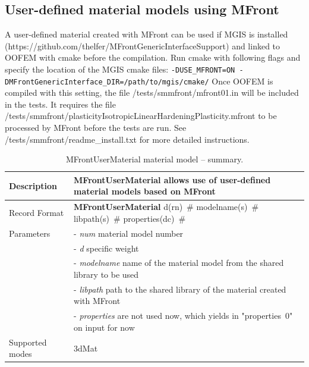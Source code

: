 \documentclass[a4paper]{article}
\newcommand{\descitem}[1]{{\noindent \bf #1}}
\newcommand{\elemparam}[2]{{{#1\tiny (#2)}~\#}}
\newcommand{\param}[1]{{\it #1}}
\newenvironment{mmt}{\begin{tabular}{|l|p{9cm}|}}{\end{tabular}\\}
\newenvironment{mmt}{\begin{tabular}{|l|l|}}{\end{tabular}\\}
\begin{document}
\subsection{User-defined material models using MFront}
A user-defined material created with MFront can be used if MGIS is installed
\newline
(https://github.com/thelfer/MFrontGenericInterfaceSupport) and linked to OOFEM with cmake before the compilation.
Run cmake with following flags and specify the location of the MGIS cmake files:
\newline
\verb|-DUSE_MFRONT=ON -DMFrontGenericInterface_DIR=/path/to/mgis/cmake/|
\newline
Once OOFEM is compiled with this setting, the file /tests/smmfront/mfront01.in will be included in the tests.
It requires the file
\newline
/tests/smmfront/plasticityIsotropicLinearHardeningPlasticity.mfront to be processed by MFront before the tests are run.
\newline
See /tests/smmfront/readme\_install.txt for more detailed instructions.

\begin{table}[!htb]
\begin{mmt}
\hline
Description & MFrontUserMaterial allows use of user-defined material models based on MFront\\
\hline
Record Format & \descitem{MFrontUserMaterial}
\elemparam{d}{rn}
\elemparam{modelname}{s}
\elemparam{libpath}{s}
\elemparam{properties}{dc}\\
Parameters &- \param{num} material model number\\
&- \param{d} specific weight\\
&- \param{modelname} name of the material model from the shared library to be used \\
&- \param{libpath} path to the shared library of the material created with MFront \\
&- \param{properties} are not used now, which yields in "properties~0" on input for now \\

Supported modes& 3dMat\\
\hline
\end{mmt}
\caption{MFrontUserMaterial material model -- summary.}
\label{MFrontUserMaterial_table}
\end{table}
\end{document}
